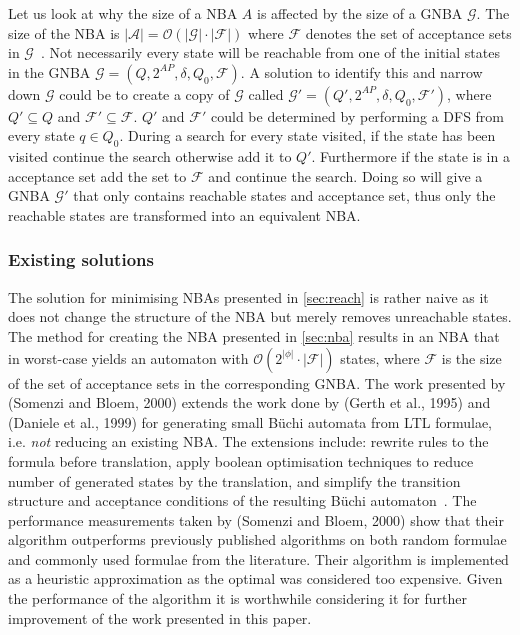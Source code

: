 Let us look at why the size of a NBA $A$ is affected by the size of a GNBA $\mathcal{G}$. The size of the NBA is $|\mathcal{A}| = \mathcal{O}(|\mathcal{G}| \cdot |\mathcal{F}|)$ where $\mathcal{F}$ denotes the set of acceptance sets in $\mathcal{G}$~\cite[thm. 4.56]{baier2008principles}. 
Not necessarily every state will be reachable from one of the initial states in the GNBA $\mathcal{G}=(Q,2^{AP},\delta,Q_0,\mathcal{F})$. A solution to identify this and narrow down $\mathcal{G}$ could be to create a copy of $\mathcal{G}$ called $\mathcal{G}'=(Q',2^{AP},\delta,Q_0,\mathcal{F}')$, where $Q' \subseteq Q$ and $\mathcal{F}' \subseteq \mathcal{F}$. $Q'$ and $\mathcal{F}'$ could be determined by performing a DFS from every state $q \in Q_0$. During a search for every state visited, if the state has been visited continue the search otherwise add it to $Q'$. Furthermore if the state is in a acceptance set add the set to $\mathcal{F}$ and continue the search. Doing so will give a GNBA $\mathcal{G}'$ that only contains reachable states and acceptance set, thus only the reachable states are transformed into an equivalent NBA.

\subsubsection{Existing solutions}\label{sec:existing}
The solution for minimising NBAs presented in \autoref{sec:reach} is rather naive as it does not change the structure of the NBA but merely removes unreachable states. The method for creating the NBA presented in \autoref{sec:nba} results in an NBA that in worst-case yields an automaton with $\mathcal{O}(2^{|\phi|} \cdot |\mathcal{F}|)$ states, where $\mathcal{F}$ is the size of the set of acceptance sets in the corresponding GNBA. The work presented by (Somenzi and Bloem, 2000)\cite{somenzi2000efficient} extends the work done by (Gerth et al., 1995)\cite{gerth1995simple} and (Daniele et al., 1999)\cite{daniele1999improved} for generating small Büchi automata from LTL formulae, i.e. \emph{not} reducing an existing NBA. The extensions include: rewrite rules to the formula before translation, apply boolean optimisation techniques to reduce number of generated states by the translation, and simplify the transition structure and acceptance conditions of the resulting Büchi automaton~\cite{somenzi2000efficient}. The performance measurements taken by (Somenzi and Bloem, 2000)\cite{somenzi2000efficient} show that their algorithm outperforms previously published algorithms on both random formulae and commonly used formulae from the literature. Their algorithm is implemented as a heuristic approximation as the optimal was considered too expensive. Given the performance of the algorithm it is worthwhile considering it for further improvement of the work presented in this paper.

